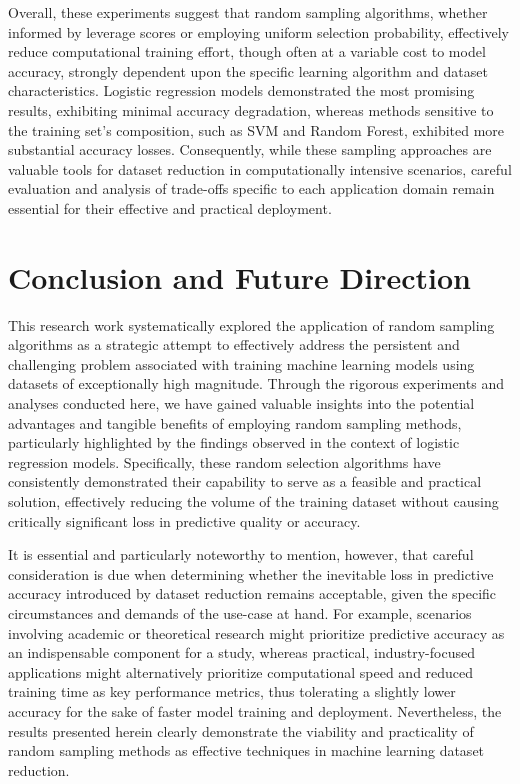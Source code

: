 \documentclass{article}
\theoremstyle{plain}
\theoremstyle{definition}
\theoremstyle{remark}
\begin{document}
Overall, these experiments suggest that random sampling algorithms, whether informed by leverage scores or employing uniform selection probability, effectively reduce computational training effort, though often at a variable cost to model accuracy, strongly dependent upon the specific learning algorithm and dataset characteristics. Logistic regression models demonstrated the most promising results, exhibiting minimal accuracy degradation, whereas methods sensitive to the training set's composition, such as SVM and Random Forest, exhibited more substantial accuracy losses. Consequently, while these sampling approaches are valuable tools for dataset reduction in computationally intensive scenarios, careful evaluation and analysis of trade-offs specific to each application domain remain essential for their effective and practical deployment.


\section{Conclusion and Future Direction}

This research work systematically explored the application of random sampling algorithms as a strategic attempt to effectively address the persistent and challenging problem associated with training machine learning models using datasets of exceptionally high magnitude. Through the rigorous experiments and analyses conducted here, we have gained valuable insights into the potential advantages and tangible benefits of employing random sampling methods, particularly highlighted by the findings observed in the context of logistic regression models. Specifically, these random selection algorithms have consistently demonstrated their capability to serve as a feasible and practical solution, effectively reducing the volume of the training dataset without causing critically significant loss in predictive quality or accuracy. 

It is essential and particularly noteworthy to mention, however, that careful consideration is due when determining whether the inevitable loss in predictive accuracy introduced by dataset reduction remains acceptable, given the specific circumstances and demands of the use-case at hand. For example, scenarios involving academic or theoretical research might prioritize predictive accuracy as an indispensable component for a study, whereas practical, industry-focused applications might alternatively prioritize computational speed and reduced training time as key performance metrics, thus tolerating a slightly lower accuracy for the sake of faster model training and deployment. Nevertheless, the results presented herein clearly demonstrate the viability and practicality of random sampling methods as effective techniques in machine learning dataset reduction. 
\end{document}

